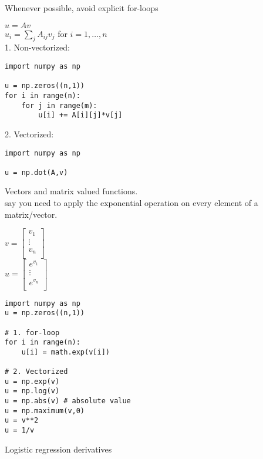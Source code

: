 \documentclass{article}
\begin{document}
Whenever possible, avoid explicit for-loops

$u = Av$\\
$u_i = \sum_{j}A_{ij}v_j$ for $i=1, \dots, n$\\

1. Non-vectorized:\\

\lstset{language=Python}
\begin{lstlisting}
import numpy as np

u = np.zeros((n,1))
for i in range(n):
    for j in range(m):
        u[i] += A[i][j]*v[j]
\end{lstlisting}

2. Vectorized:\\

\lstset{language=Python}
\begin{lstlisting}
import numpy as np

u = np.dot(A,v)
\end{lstlisting}

Vectors and matrix valued functions.\\
    say you need to apply the exponential operation on every element of a matrix/vector.

$v =
\begin{bmatrix}
v_1\\
\vdots\\
v_n\\
\end{bmatrix}
$\\

$u =
\begin{bmatrix}
e^{v_1}\\
\vdots\\
e^{v_n}\\
\end{bmatrix}
$\\

\lstset{language=Python}
\begin{lstlisting}
import numpy as np
u = np.zeros((n,1))

# 1. for-loop
for i in range(n):
    u[i] = math.exp(v[i])

# 2. Vectorized
u = np.exp(v)
u = np.log(v)
u = np.abs(v) # absolute value
u = np.maximum(v,0)
u = v**2
u = 1/v

\end{lstlisting}

Logistic regression derivatives\\
\end{document}
